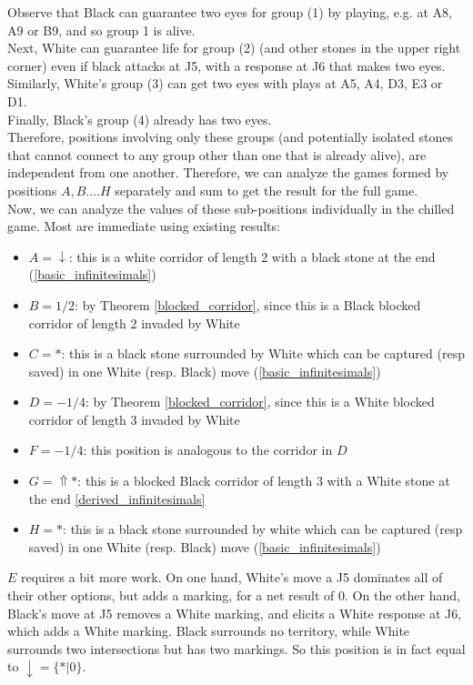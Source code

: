 \documentclass[../math194_paper.tex]{subfiles}
\begin{document}
Observe that Black can guarantee two eyes for group (1) by playing, e.g. at A8, A9 or B9, and 
so group 1 is alive. \\
Next, White can guarantee life for group (2) (and other stones in the upper right corner) even if 
black attacks at J5, with a response at J6 that makes two eyes. \\
Similarly, White's group (3) can get two eyes with plays at A5, A4, D3, E3 or D1. \\
Finally, Black's group (4) already has two eyes. \\
Therefore, positions involving only these groups (and potentially isolated stones that cannot connect 
to any group other than one that is already alive), are independent from one another. Therefore, we 
can analyze the games formed by positions $A, B. \ldots H$ separately and sum to get the result 
for the full game. \\

Now, we can analyze the values of these sub-positions individually in the chilled game. Most are immediate using 
existing results:
\begin{itemize}
    \item $A = \downarrow$: this is a white corridor of length 2 with a black stone at the end 
    (\ref{basic_infinitesimals})
    \item $B = 1/2$: by Theorem \ref{blocked_corridor}, since this is a Black blocked corridor of length 2 invaded by White
    \item $C = *$: this is a black stone surrounded by White which can be captured (resp saved) in one 
    White (resp. Black) move (\ref{basic_infinitesimals})
    \item $D = -1/4$: by Theorem \ref{blocked_corridor}, since this is a White blocked corridor of length 3 invaded by White
    \item $F = -1/4$: this position is analogous to the corridor in $D$ 
    \item $G = \Uparrow *$: this is a blocked Black corridor of length 3 with a White stone at the end 
    \ref{derived_infinitesimals}
    \item $H = *$:  this is a black stone surrounded by white which can be captured (resp saved) in one 
    White (resp. Black) move (\ref{basic_infinitesimals})
\end{itemize}
$E$ requires a bit more work. On one hand, White's move a J5 dominates all of their other options, but 
adds a marking, for a net result of 0. 
On the other hand, Black's move at J5 removes a White marking, and elicits a White response at 
J6, which adds a White marking. Black surrounds no territory, while White surrounds two intersections 
but has two markings. So this position is in fact equal to $\downarrow = \{*|0\}$.  \\
\end{document}

